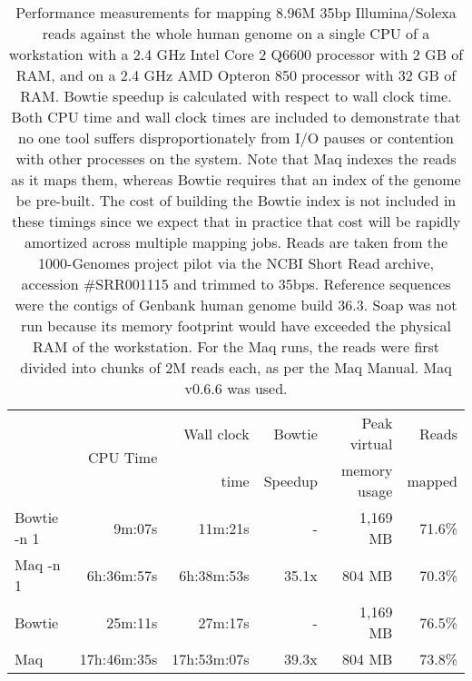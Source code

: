 \documentclass[letterpaper]{article}
\begin{document}
\begin{table}[tp]
\scriptsize
\begin{tabular}{lrrrrr}
\toprule
 & \multirow{2}{*}{CPU Time} & Wall clock & Bowtie  & Peak virtual & Reads  \\
 &                            & time       & Speedup & memory usage & mapped \\[3pt]
\toprule
Bowtie -n 1 & 9m:07s & 11m:21s & - & 1,169 MB & 71.6\%\\\midrule
Maq -n 1 & 6h:36m:57s & 6h:38m:53s & 35.1x & 804 MB & 70.3\%\\\midrule
\midrule
Bowtie & 25m:11s & 27m:17s & - & 1,169 MB & 76.5\%\\\midrule
Maq & 17h:46m:35s & 17h:53m:07s & 39.3x & 804 MB & 73.8\%\\
\bottomrule
\end{tabular}
\caption{Performance measurements for mapping 8.96M 35bp Illumina/Solexa reads against the whole human genome on a single CPU of a workstation with a 2.4 GHz Intel Core 2 Q6600 processor with 2 GB of RAM, and on a 2.4 GHz AMD Opteron 850 processor with 32 GB of RAM. Bowtie speedup is calculated with respect to wall clock time. Both CPU time and wall clock times are included to demonstrate that no one tool suffers disproportionately from I/O pauses or contention with other processes on the system. Note that Maq indexes the reads as it maps them, whereas Bowtie requires that an index of the genome be pre-built.  The cost of building the Bowtie index is not included in these timings since we expect that in practice that cost will be rapidly amortized across multiple mapping jobs. Reads are taken from the 1000-Genomes project pilot via the NCBI Short Read archive, accession \#SRR001115 and trimmed to 35bps. Reference sequences were the contigs of Genbank human genome build 36.3. Soap was not run because its memory footprint would have exceeded the physical RAM of the workstation. For the Maq runs, the reads were first divided into chunks of 2M reads each, as per the Maq Manual. Maq v0.6.6 was used. }
\end{table}
\end{document}
